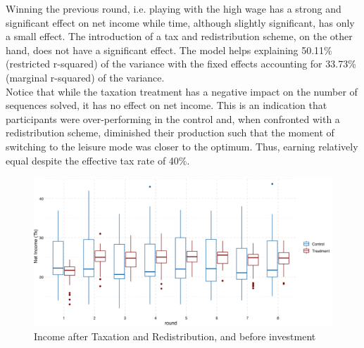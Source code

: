 Winning the previous round, i.e. playing with the high wage has a strong and significant effect on net income while time, although slightly significant, has only a small effect. The introduction of a tax and redistribution scheme, on the other hand, does not have a significant effect. The model helps explaining 50.11\% (restricted r-squared) of the variance with the fixed effects accounting for 33.73\% (marginal r-squared) of the variance.\\

Notice that while the taxation treatment has a negative impact on the number of sequences solved, it has no effect on net income. This is an indication that participants were over-performing in the control and, when confronted with a redistribution scheme, diminished their production such that the moment of switching to the leisure mode was closer to the optimum. Thus, earning relatively equal despite the effective tax rate of 40\%.\\

\begin{figure}
    \centering
    \includegraphics[width=\textwidth]{graphs/earnings_boxplot.png}
    \caption{Income after Taxation and Redistribution, and before investment}
    \label{fig:earnings_boxplot}
\end{figure}



